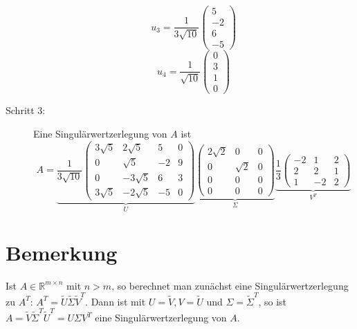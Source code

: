 \documentclass{scrbook}
\begin{document}
\begin{description}
\[u_3 = \frac{1}{3\sqrt{10}} \left(
\begin{array}{c}
5\\-2\\6\\-5
\end{array}
\right) \]
\[u_4 = \frac{1}{\sqrt{10}} \left(
\begin{array}{c}
0\\3\\1\\0
\end{array}
\right) \]
\item[Schritt 3:] Eine Singulärwertzerlegung von $A$ ist
\[A = \underbrace{\frac{1}{3\sqrt{10}}
\left(
\begin{array}{cccc}
3\sqrt{5} & 2 \sqrt{5}& 5 &0\\
0 &  \sqrt{5} & -2 &9\\
0 &-3\sqrt{5} & 6 & 3\\
3\sqrt{5} & -2\sqrt{5} & -5 & 0
\end{array}
\right)}_{U}\underbrace{\left(
\begin{array}{ccc}
2\sqrt{2}&0&0\\
0&\sqrt{2}&0\\
0&0&0\\
0&0&0
\end{array}
\right)}_{\Sigma}
\underbrace{
\frac{1}{3}
\left(
\begin{array}{ccc}
-2&1&2\\
2&2&1\\
1&-2&2
\end{array}
\right)
}_{V^T}
\]
\end{description}
\section{Bemerkung}
Ist $A \in \mathbb{R}^{m \times n}$ mit $n > m$, so berechnet man zunächst eine Singulärwertzerlegung zu $A^T$: $A^T = \tilde{U} \tilde{\Sigma} \tilde{V}^T$. Dann ist mit $U = \tilde{V}, V = \tilde{U}$ und $\Sigma = \tilde{\Sigma}^T$, so ist $A= \tilde{V} \tilde{\Sigma}^T \tilde{U}^T = U\Sigma V^T$ eine Singulärwertzerlegung von $A$.
\end{document}
